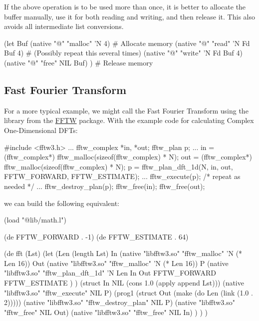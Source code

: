 If the above operation is to be used more than once, it is better to
allocate the buffer manually, use it for both reading and writing, and
then release it. This also avoids all intermediate list conversions.

\begin{wideverbatim}
(let Buf (native "@" "malloc" 'N 4) # Allocate memory
   (native "@" "read" 'N Fd Buf 4)  # (Possibly repeat this several times)
   (native "@" "write" 'N Fd Buf 4)
   (native "@" "free" NIL Buf) )    # Release memory
\end{wideverbatim}

\subsection{Fast Fourier Transform}
\label{sec:native-fast-fourier-transform}

For a more typical example, we might call the Fast Fourier Transform
using the library from the \href{http://fftw.org}{FFTW} package. With
the example code for calculating Complex One-Dimensional DFTs:

\begin{wideverbatim}
#include <fftw3.h>
...
{
   fftw_complex *in, *out;
   fftw_plan p;
   ...
   in = (fftw_complex*) fftw_malloc(sizeof(fftw_complex) * N);
   out = (fftw_complex*) fftw_malloc(sizeof(fftw_complex) * N);
   p = fftw_plan_dft_1d(N, in, out, FFTW_FORWARD, FFTW_ESTIMATE);
   ...
   fftw_execute(p); /* repeat as needed */
   ...
   fftw_destroy_plan(p);
   fftw_free(in); fftw_free(out);
}
\end{wideverbatim}

we can build the following equivalent:

\begin{wideverbatim}
(load "@lib/math.l")

(de FFTW_FORWARD . -1)
(de FFTW_ESTIMATE . 64)

(de fft (Lst)
   (let
      (Len (length Lst)
         In (native "libfftw3.so" "fftw_malloc" 'N (* Len 16))
         Out (native "libfftw3.so" "fftw_malloc" 'N (* Len 16))
         P (native "libfftw3.so" "fftw_plan_dft_1d" 'N
            Len In Out FFTW_FORWARD FFTW_ESTIMATE ) )
      (struct In NIL (cons 1.0 (apply append Lst)))
      (native "libfftw3.so" "fftw_execute" NIL P)
      (prog1 (struct Out (make (do Len (link (1.0 . 2)))))
         (native "libfftw3.so" "fftw_destroy_plan" NIL P)
         (native "libfftw3.so" "fftw_free" NIL Out)
         (native "libfftw3.so" "fftw_free" NIL In) ) ) )
\end{wideverbatim}

